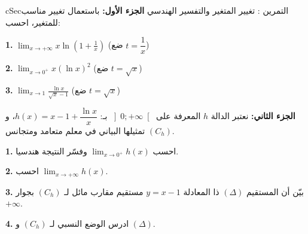 \documentclass[12pt,a4paper]{article}
\newenvironment{BOX}[2]{\begin{otherlanguage}{english}\begin{arbox}{#1}{#2}}{\end{arbox}\end{otherlanguage}}
\newcounter{exo}
\newenvironment{tamrin}[1]{\stepcounter{exo}\begin{BOX}{cSec}{التمرين \theexo: #1}}{\end{BOX}}
\newcommand{\QQ}[1]{\par\smallskip\textbf{#1.} }
\begin{document}
\begin{tamrin}{تغيير المتغير والتفسير الهندسي}
\textbf{الجزء الأول:} باستعمال تغيير مناسب للمتغير، احسب:
\QQ{1} $\displaystyle\lim_{x\to+\infty}x\ln\left(1+\frac1x\right)$ \quad (ضع $t=\dfrac1x$)
\QQ{2} $\displaystyle\lim_{x\to 0^{+}}x\left(\ln x\right)^{2}$ \quad (ضع $t=\sqrt x$)
\QQ{3} $\displaystyle\lim_{x\to 1}\frac{\ln x}{\sqrt x-1}$ \quad (ضع $t=\sqrt x$)

\textbf{الجزء الثاني:} نعتبر الدالة $h$ المعرفة على $\left]0;+\infty\right[$ بـ: $h(x)=x-1+\dfrac{\ln x}{x}$، و $(C_h)$ تمثيلها البياني في معلم متعامد ومتجانس.
\QQ{1} احسب $\displaystyle\lim_{x\to 0^{+}}h(x)$ وفسّر النتيجة هندسيا.
\QQ{2} احسب $\displaystyle\lim_{x\to+\infty}h(x)$.
\QQ{3} بيّن أن المستقيم $(\Delta)$ ذا المعادلة $y=x-1$ مستقيم مقارب مائل لـ $(C_h)$ بجوار $+\infty$.
\QQ{4} ادرس الوضع النسبي لـ $(C_h)$ و $(\Delta)$.
\end{tamrin}
\end{document}
